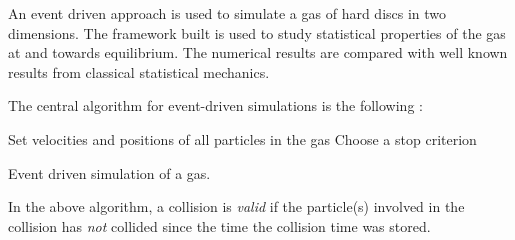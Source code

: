 An event driven approach is used to simulate a gas of hard discs in two dimensions. The framework built is used to study statistical properties of the gas at and towards equilibrium. The numerical results are compared with well known results from classical statistical mechanics. 

The central algorithm for event-driven simulations is the following \cite{event_sim}:

\begin{algorithm}[H]
	Set velocities and positions of all particles in the gas\;
	Choose a stop criterion\;
	\caption{Event driven simulation of a gas.}
\end{algorithm}

In the above algorithm, a collision is \textit{valid} if the particle(s) involved in the collision has \textit{not} collided since the time the collision time was stored. 
